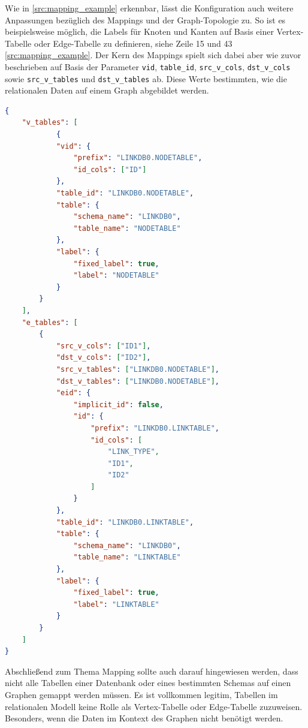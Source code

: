 Wie in \autoref{src:mapping_example} erkennbar, lässt die Konfiguration auch weitere Anpassungen bezüglich des Mappings und der Graph-Topologie zu. So ist es beispielsweise möglich, die Labels für Knoten und Kanten auf Basis einer Vertex-Tabelle oder Edge-Tabelle zu definieren, siehe Zeile 15 und 43 \autoref{src:mapping_example}. Der Kern des Mappings spielt sich dabei aber wie zuvor beschrieben auf Basis der Parameter \texttt{\acs{vid}}, \texttt{table\_id}, \texttt{src\_v\_cols}, \texttt{dst\_v\_cols} sowie \texttt{src\_v\_tables} und \texttt{dst\_v\_tables} ab. Diese Werte bestimmten, wie die relationalen Daten auf einem Graph abgebildet werden.

\begin{lstlisting}[caption={Beispiel Ausschnitt Mapping Konfiguration},language=json,label=src:mapping_example]
{
    "v_tables": [
            {
            "vid": {
                "prefix": "LINKDB0.NODETABLE",
                "id_cols": ["ID"]
            },
            "table_id": "LINKDB0.NODETABLE",
            "table": {
                "schema_name": "LINKDB0",
                "table_name": "NODETABLE"
            },
            "label": {
                "fixed_label": true,
                "label": "NODETABLE"
            }
        }
    ],
    "e_tables": [
        {
            "src_v_cols": ["ID1"],
            "dst_v_cols": ["ID2"],
            "src_v_tables": ["LINKDB0.NODETABLE"],
            "dst_v_tables": ["LINKDB0.NODETABLE"],
            "eid": {
                "implicit_id": false,
                "id": {
                    "prefix": "LINKDB0.LINKTABLE",
                    "id_cols": [
                        "LINK_TYPE",
                        "ID1",
                        "ID2"
                    ]
                }
            },
            "table_id": "LINKDB0.LINKTABLE",
            "table": {
                "schema_name": "LINKDB0",
                "table_name": "LINKTABLE"
            },
            "label": {
                "fixed_label": true,
                "label": "LINKTABLE"
            }
        }
    ]
}
\end{lstlisting}

Abschließend zum Thema Mapping sollte auch darauf hingewiesen werden, dass nicht alle Tabellen einer Datenbank oder eines bestimmten Schemas auf einen Graphen gemappt werden müssen. Es ist vollkommen legitim, Tabellen im relationalen Modell keine Rolle als Vertex-Tabelle oder Edge-Tabelle zuzuweisen. Besonders, wenn die Daten im Kontext des Graphen nicht benötigt werden. 

